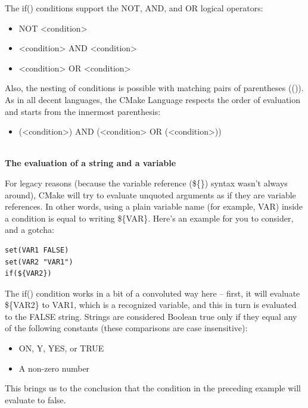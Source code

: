 The if() conditions support the NOT, AND, and OR logical operators:

\begin{itemize}
\item 
NOT <condition>

\item 
<condition> AND <condition>

\item 
<condition> OR <condition>
\end{itemize}

Also, the nesting of conditions is possible with matching pairs of parentheses (()). As in all decent languages, the CMake Language respects the order of evaluation and starts from the innermost parenthesis:

\begin{itemize}
\item 
(<condition>) AND (<condition> OR (<condition>))
\end{itemize}

\hspace*{\fill} \\ %
\noindent
\textbf{The evaluation of a string and a variable}

For legacy reasons (because the variable reference (\$\{\}) syntax wasn't always around), CMake will try to evaluate unquoted arguments as if they are variable references. In other words, using a plain variable name (for example, VAR) inside a condition is equal to writing \$\{VAR\}. Here's an example for you to consider, and a gotcha:

\begin{lstlisting}[style=styleCMake]
set(VAR1 FALSE)
set(VAR2 "VAR1")
if(${VAR2})
\end{lstlisting}

The if() condition works in a bit of a convoluted way here – first, it will evaluate \$\{VAR2\} to VAR1, which is a recognized variable, and this in turn is evaluated to the FALSE string. Strings are considered Boolean true only if they equal any of the following constants (these comparisons are case insensitive):

\begin{itemize}
\item 
ON, Y, YES, or TRUE

\item 
A non-zero number
\end{itemize}

This brings us to the conclusion that the condition in the preceding example will evaluate to false.

